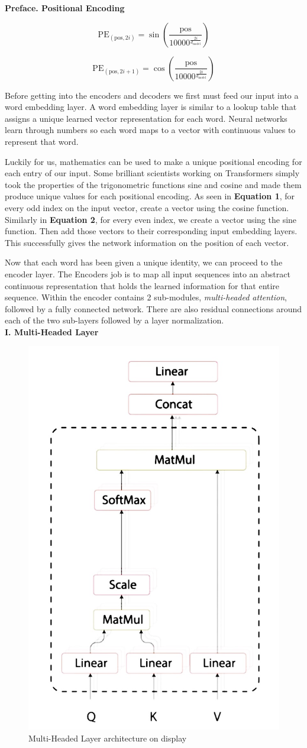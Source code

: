 \noindent
\textbf{Preface. Positional Encoding}

\begin{equation}
\label{Pos Encode}
\text{PE}_{(\text{pos},2i)} = \sin(\frac{\text{pos}}{10000^{\frac{2i}{d_{\text{model}}}}})
\end{equation}

\begin{equation}
\label{Pos Encode2}
\text{PE}_{(\text{pos},2i+1)} = \cos(\frac{\text{pos}}{10000^{\frac{2i}{d_{\text{model}}}}})
\end{equation}

Before getting into the encoders and decoders we first must feed our input into a word embedding layer. A word embedding layer is similar to a lookup table that assigns a unique learned vector representation for each word. Neural networks learn through numbers so each word maps to a vector with continuous values to represent that word. 

Luckily for us, mathematics can be used to make a unique positional encoding for each entry of our input. Some brilliant scientists working on Transformers simply took the properties of the trigonometric functions sine and cosine and made them produce unique values for each positional encoding. As seen in \textbf{Equation 1}, for every odd index on the input vector, create a vector using the cosine function. Similarly in \textbf{Equation 2}, for every even index, we create a vector using the sine function. Then add those vectors to their corresponding input embedding layers. This successfully gives the network information on the position of each vector. 

Now that each word has been given a unique identity, we can proceed to the encoder layer. The Encoders job is to map all input sequences into an abstract continuous representation that holds the learned information for that entire sequence. Within the encoder contains 2 sub-modules, \emph{multi-headed attention}, followed by a fully connected network. There are also residual connections around each of the two sub-layers followed by a layer normalization.\\

\noindent
\textbf{I. Multi-Headed Layer}

\begin{figure}[H]
\centering
\includegraphics[width=.35\textwidth]{figures/t3.jpg}
\caption{Multi-Headed Layer architecture on display}
\end{figure}

